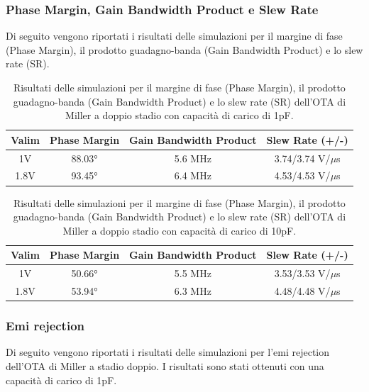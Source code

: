 \subsubsection{Phase Margin, Gain Bandwidth Product e Slew Rate}
\label{sec:results_ota_miller_double_stage_phase_margin_gain_bandwidth_product_slew_rate}

Di seguito vengono riportati i risultati delle simulazioni per il margine di fase (Phase Margin), il prodotto guadagno-banda (Gain Bandwidth Product) e lo slew rate (SR).

\begin{table}[H]
    \centering
    \caption{Risultati delle simulazioni per il margine di fase (Phase Margin), il prodotto guadagno-banda (Gain Bandwidth Product) e lo slew rate (SR) dell'OTA di Miller a doppio stadio con capacità di carico di 1pF.}
    \begin{tabular}{|c|c|c|c|}
        \hline
        \textbf{Valim} & \textbf{Phase Margin} & \textbf{Gain Bandwidth Product} & \textbf{Slew Rate (+/-)} \\ \hline
        1V & 88.03° & 5.6 MHz & 3.74/3.74 V/$\mu$s \\ \hline
        1.8V & 93.45° & 6.4 MHz & 4.53/4.53 V/$\mu$s \\ \hline
    \end{tabular}
    \label{tab:results_miller_double_stage_1pF}
\end{table}

\begin{table}[H]
    \centering
    \caption{Risultati delle simulazioni per il margine di fase (Phase Margin), il prodotto guadagno-banda (Gain Bandwidth Product) e lo slew rate (SR) dell'OTA di Miller a doppio stadio con capacità di carico di 10pF.}
    \begin{tabular}{|c|c|c|c|}
        \hline
        \textbf{Valim} & \textbf{Phase Margin} & \textbf{Gain Bandwidth Product} & \textbf{Slew Rate (+/-)} \\ \hline
        1V & 50.66° & 5.5 MHz & 3.53/3.53 V/$\mu$s \\ \hline
        1.8V & 53.94° & 6.3 MHz & 4.48/4.48 V/$\mu$s \\ \hline
    \end{tabular}
    \label{tab:results_miller_double_stage_10pF}
\end{table}



\subsubsection{Emi rejection}
\label{sec:results_ota_miller_double_stage_emi_rejection}
Di seguito vengono riportati i risultati delle simulazioni per l'emi rejection dell'OTA di Miller a stadio doppio. I risultati sono stati ottenuti con una capacità di carico di 1pF.

